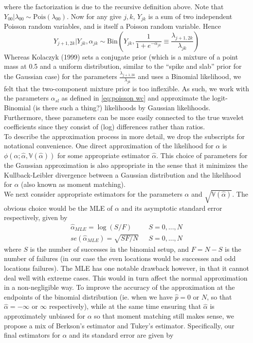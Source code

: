 \documentclass[12pt]{article}
\newcommand{\Ga}{\alpha}
\newcommand{\Gl}{\lambda}    \newcommand{\GL}{\Lambda}
\begin{document}
where the factorization is due to the recursive definition above. Note that $Y_{00}|\Gl_{00}\sim \textrm{Pois}(\Gl_{00})$. Now for any give $j,k$, $Y_{jk}$ is a sum of two independent Poisson random variables, and is itself a Poisson random variable. Hence
\[Y_{j+1,2k}|Y_{jk},\Ga_{jk}\sim \textrm{Bin}({Y_{jk},\frac{1}{1+e^{-\Ga_{jk}}}\equiv\frac{\Gl_{j+1,2k}}{\Gl_{jk}}})\]
Whereas Kolaczyk (1999) sets a conjugate prior (which is a mixture of a point mass at 0.5 and a uniform distribution, similar to the ``spike and slab'' prior for the Gaussian case) for the parameters $\frac{\Gl_{j+1,2k}}{\Gl_{jk}}$ and uses a Binomial likelihood, we felt that the two-component mixture prior is too inflexible. As such, we work with the parameters $\Ga_{sl}$ as defined in \eqref{eq:poisson wc} and approximate the logit-Binomial (is there such a thing?) likelihoods by Gaussian likelihoods. Furthermore, these parameters can be more easily connected to the true wavelet coefficients since they consist of (log) differences rather than ratios.\bigskip\\
To describe the approximation process in more detail, we drop the subscripts for notational convenience. One direct approximation of the likelihood for $\Ga$ is $\phi(\Ga;\hat{\Ga},\mathbb{V}(\hat{\Ga}))$ for some appropriate estimator $\hat{\Ga}$. This choice of parameters for the Gaussian approximation is also appropriate in the sense that it minimizes the Kullback-Leibler divergence between a Gaussian distribution and the likelihood for $\Ga$ (also known as moment matching).\bigskip\\
We next consider appropriate estimators for the parameters $\Ga$ and $\sqrt{\mathbb{V}(\hat{\Ga})}$. The obvious choice would be the MLE of $\Ga$ and its asymptotic standard error respectively, given by
\begin{eqnarray}
\hat{\Ga}_{MLE}=\log(S/F)&\ \ \ S=0,...,N\\
se(\hat{\Ga}_{MLE})=\sqrt{SF/N}&\ \ \ S=0,...,N
\end{eqnarray}
where $S$ is the number of successes in the binomial setup, and $F=N-S$ is the number of failures (in our case the even locations would be successes and odd locations failures). The MLE has one notable drawback however, in that it cannot deal well with extreme cases. This would in turn affect the normal approximation in a non-negligible way. To improve the accuracy of the approximation at the endpoints of the binomial distribution (ie. when we have $\hat{p}=0$ or $N$, so that $\hat{\Ga}=-\infty$ or $\infty$ respectively), while at the same time ensuring that $\hat{\Ga}$ is approximately unbiased for $\Ga$ so that moment matching still makes sense, we propose a mix of Berkson's estimator and Tukey's estimator. Specifically, our final estimators for $\Ga$ and its standard error are given by
\end{document}
